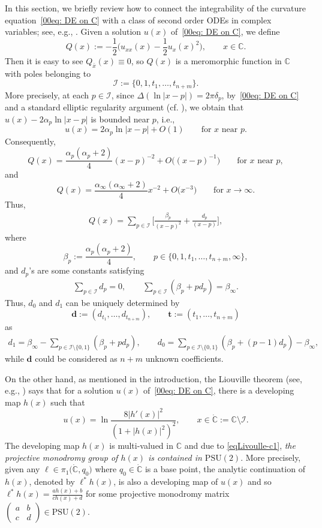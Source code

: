 \documentclass[pdftex]{sigma}
\numberwithin{equation}{section}
\def\C{\mathbb C}
\def\PSU{\mathrm{PSU}}
\def\SM#1#2#3#4{\left(\begin{smallmatrix}#1&#2\\#3&#4\end{smallmatrix}
 \right)}
\def\bt{\boldsymbol t}
\begin{document}
In this section, we briefly review how to connect the integrability of the curvature equation~\eqref{00eq: DE on C} with a class of second order ODEs in complex variables; see, e.g., \cite{Chai-Lin-Wang,Coaxial}. Given a solution $u(x)$ of~\eqref{00eq: DE on C}, we define
\begin{equation*}%
 Q(x):=-\frac12\biggl(u_{xx}(x)-\frac12 u_x(x)^2\biggr),\qquad
 x\in\mathbb{C}.
\end{equation*}
Then it is easy to see $Q_{\bar{x}}(x)\equiv 0$, so $Q(x)$ is a meromorphic function in $\mathbb{C}$ with poles belonging to
\[
 \mathcal{I}:=\{0,1,t_1,\dots,t_{n+m}\}.
\]
More precisely, at each $p\in\mathcal{I}$, since $\Delta (\ln|x-p|)=2\pi\delta_p$, by~\eqref{00eq: DE on C} and a standard elliptic regularity argument (cf. \cite{BM}), we obtain that $u(x)-2\alpha_p\ln|x-p|$ is bounded near $p$, i.e.,
\[u(x)=2\alpha_p\ln|x-p|+O(1)\qquad\text{for $x$ near $p$}.\]
Consequently,
\[Q(x)=\frac{\alpha_p(\alpha_p+2)}{4}(x-p)^{-2}+O\bigl((x-p)^{-1}\bigr)\qquad\text{for $x$ near $p$},\]
and
\[Q(x)=\frac{\alpha_\infty(\alpha_\infty+2)}{4}x^{-2}+O\bigl(x^{-3}\bigr)\qquad\text{for $x\to \infty$}.\]
Thus,
\begin{align}\label{e0q-30}
Q(x)=\sum_{p\in\mathcal{I}}\biggl[\frac{\beta_p}{(x-p)^2}+\frac{d_p}{(x-p)}\biggr],
\end{align}
where
\begin{equation}\label{e0q-31}
 \beta_p:=\frac{\alpha_{p}(\alpha_{p}+2)}{4},\qquad p\in \{0,1,t_1,\dots, t_{n+m},\infty\},
\end{equation}
and $d_p$'s are some constants satisfying
\begin{align}\label{e0q-32}
\sum_{p\in \mathcal{I}}d_p=0,\qquad \sum_{p\in \mathcal{I}}(\beta_p+pd_p)=\beta_\infty.
\end{align}
Thus, $d_0$ and $d_1$ can be uniquely determined by
\[
 \boldsymbol d:=(d_{t_1},\dots, d_{t_{n+m}}),\qquad
 \bt:=(t_1,\dots,t_{n+m})
\]
as
\begin{align*}%
d_1=\beta_\infty-\sum_{p\in\mathcal{I}\setminus\{0,1\}}(\beta_p+pd_p),
 \qquad d_0=\sum_{p\in \mathcal{I}\setminus\{0,1\}}
 (\beta_p+(p-1)d_p)-\beta_\infty,
\end{align*}
 while $\boldsymbol d$ could be considered as $n+m$ unknown coefficients.

On the other hand, as mentioned in the introduction, the Liouville
theorem (see, e.g., \cite{Chai-Lin-Wang}) says that for a solution
$u(x)$ of~\eqref{00eq: DE on C}, there is a developing map $h(x)$ such
that
\begin{equation}\label{eqLivoulle-c1}
u(x)=\ln\frac{8|h'(x)|^2}{(1+|h(x)|^2)^2},\qquad x\in \dot{\C}:=\mathbb{C}\setminus\mathcal{I}.
\end{equation}
The developing map $h(x)$ is multi-valued in $\mathbb{C}$ and due to
\eqref{eqLivoulle-c1}, \emph{the projective monodromy group of $h(x)$
 is contained in $\PSU(2)$}. More precisely, given any $\ell\in
\pi_1\bigl(\dot{\C}, q_0\bigr)$ where $q_0\in\dot{\C}$ is a base point, the
analytic continuation of $h(x)$, denoted by $\ell^*h(x)$, is also a
developing map of $u(x)$ and so $\ell^*h(x)=\frac{ah(x)+b}{ch(x)+d}$
for some projective monodromy matrix $\SM{a}{b}{c}{d}\in\PSU(2)$.
\end{document}

